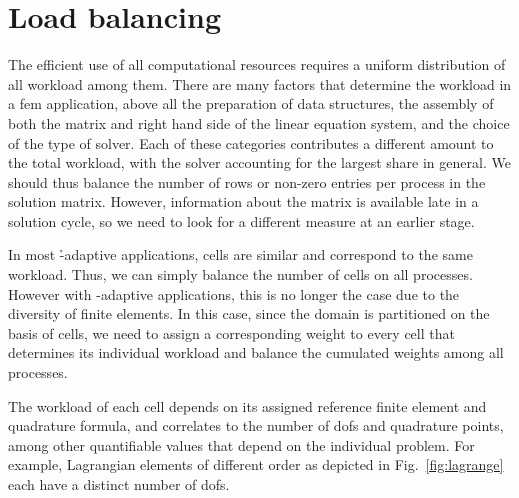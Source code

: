 \section{Load balancing}
\label{sec:balancing}

\enlargethispage{\baselineskip} The efficient use of all computational resources requires a uniform distribution of all workload among them. There are many factors that determine the workload in a \gls{fem} application, above all the preparation of data structures, the assembly of both the matrix and right hand side of the linear equation system, and the choice of the type of solver. Each of these categories contributes a different amount to the total workload, with the solver accounting for the largest share in general. We should thus balance the number of rows or non-zero entries per process in the solution matrix. However, information about the matrix is available late in a solution cycle, so we need to look for a different measure at an earlier stage.

In most \h-adaptive applications, cells are similar and correspond to the same workload. Thus, we can simply balance the number of cells on all processes. However with \hp-adaptive applications, this is no longer the case due to the diversity of finite elements. %
In this case, since the domain is partitioned on the basis of cells, we need to assign a corresponding weight to every cell that determines its individual workload and balance the cumulated weights among all processes.

The workload of each cell depends on its assigned reference finite element and quadrature formula, and correlates to the number of \glspl{dof} and quadrature points, among other quantifiable values that depend on the individual problem. For example, Lagrangian elements of different order as depicted in Fig.~\ref{fig:lagrange} each have a distinct number of \glspl{dof}.



